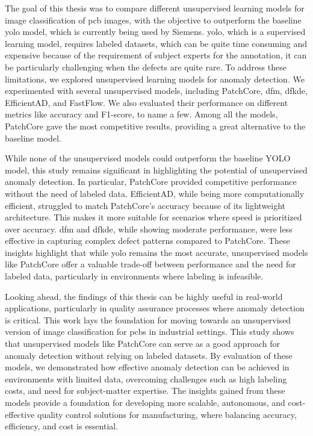 The goal of this thesis was to compare different unsupervised learning models for image classification of \gls{pcb} images, with the objective to outperform the baseline \gls{yolo} model, which is currently being used by Siemens. \gls{yolo}, which is a supervised learning model, requires labeled datasets, which can be quite time consuming and expensive because of the requirement of subject experts for the annotation, it can be particularly challenging when the defects are quite rare. To address these limitations, we explored unsupervised learning models for anomaly detection. We experimented with several unsupervised models, including PatchCore, \gls{dfm}, \gls{dfkde}, EfficientAD, and FastFlow. We also evaluated their performance on different metrics like accuracy and F1-score, to name a few. Among all the models, PatchCore gave the most competitive results, providing a great alternative to the baseline model.

While none of the unsupervised models could outperform the baseline YOLO model, this study remains significant in highlighting the potential of unsupervised anomaly detection. In particular, PatchCore provided competitive performance without the need of labeled data. EfficientAD, while being more computationally efficient, struggled to match PatchCore's accuracy because of its lightweight architecture. This makes it more suitable for scenarios where speed is prioritized over accuracy. \gls{dfm} and \gls{dfkde}, while showing moderate performance, were less effective in capturing complex defect patterns compared to PatchCore. These insights highlight that while \gls{yolo} remains the most accurate, unsupervised models like PatchCore offer a valuable trade-off between performance and the need for labeled data, particularly in environments where labeling is infeasible.

Looking ahead, the findings of this thesis can be highly useful in real-world applications, particularly in quality assurance processes where anomaly detection is critical. This work lays the foundation for moving towards an unsupervised version of image classification for \glspl{pcb} in industrial settings. This study shows that unsupervised models like PatchCore can serve as a good approach for anomaly detection without relying on labeled datasets. By evaluation of these models, we demonstrated how effective anomaly detection can be achieved in environments with limited data, overcoming challenges such as high labeling costs, and need for subject-matter expertise. The insights gained from these models provide a foundation for developing more scalable, autonomous, and cost-effective quality control solutions for manufacturing, where balancing accuracy, efficiency, and cost is essential.